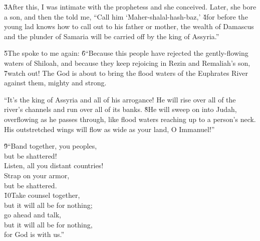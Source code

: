 \v{3}After this, I was intimate with the prophetess and she conceived. Later, she bore a son, and then the  told me, ``Call him `Maher-shalal-hash-baz,' \v{4}for before the young lad knows how to call out to his father or mother, the wealth of Damascus and the plunder of Samaria will be carried off by the king of Assyria.''

\v{5}The  spoke to me again: \v{6}``Because this people have rejected the gently-flowing waters of Shiloah, and because they keep rejoicing in Rezin and Remaliah's son, \v{7}watch out! The  God is about to bring the flood waters of the Euphrates River against them, mighty and strong.

``It's the king of Assyria and all of his arrogance! He will rise over all of the river's channels and run over all of its banks. \v{8}He will sweep on into Judah, overflowing as he passes through, like flood waters reaching up to a person's neck. His outstretched wings will flow as wide as your land, O Immanuel!''

\begin{poetry}
\poeml \v{9}``Band together, you peoples, \\
\poemll    but be shattered! \\
\poemlll       Listen, all you distant countries! \\
\poeml Strap on your armor, \\
\poemlll       but be shattered. \\
\poeml \v{10}Take counsel together, \\
\poemll    but it will all be for nothing; \\
\poeml go ahead and talk, \\
\poemll    but it will all be for nothing, \\
\poemlll       for God is with us.''
\end{poetry}

